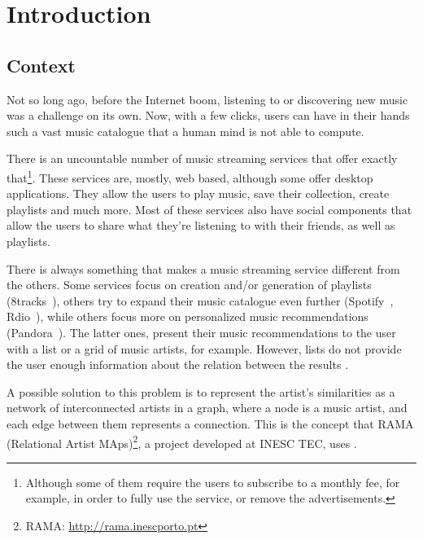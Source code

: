 
\chapter{Introduction} \label{chap:intro}


\section*{}

\section{Context} \label{sec:context}


  Not so long ago, before the Internet boom, listening to or discovering new music was a challenge on its own.
  Now, with a few clicks, users can have in their hands such a vast music catalogue that a human mind is not able to compute.

  There is an uncountable number of music streaming services that offer exactly that\footnote{Although some of them require the users to subscribe to a monthly fee, for example, in order to fully use the service, or remove the advertisements.}.
  These services are, mostly, web based, although some offer desktop applications.
  They allow the users to play music, save their collection, create playlists and much more.
  Most of these services also have social components that allow the users to share what they're listening to with their friends, as well as playlists.

  There is always something that makes a music streaming service different from the others.
  Some services focus on creation and/or generation of playlists (8tracks~\cite{8tracks}), others try to expand their music catalogue even further (Spotify~\cite{spotify}, Rdio~\cite{rdio}), while others focus more on personalized music recommendations (Pandora~\cite{pandora}).
  The latter ones, present their music recommendations to the user with a list or a grid of music artists, for example.
  However, lists do not provide the user enough information about the relation between the results \cite{Lamere2008}.

  A possible solution to this problem is to represent the artist's similarities as a network of interconnected artists in a graph, where a node is a music artist, and each edge between them represents a connection.
  This is the concept that RAMA (Relational Artist MAps)\footnote{RAMA: \url{http://rama.inescporto.pt}}, a project developed at INESC TEC, uses \cite{Costa2008} \cite{Sarmento2009} \cite{Costa2009} \cite{Gouyon2011}.

